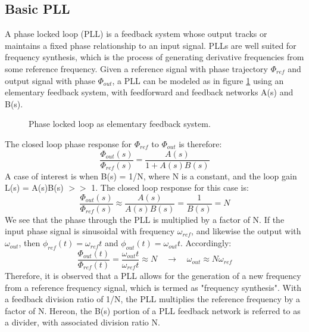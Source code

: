 		



	\subsection{Basic PLL}
	A phase locked loop (PLL) is a feedback system whose output tracks or maintains a fixed phase relationship to an input signal. PLLs are well suited for frequency synthesis, which is the process of generating derivative frequencies from some reference frequency. Given a reference signal with phase trajectory $\Phi_{ref}$ and output signal with phase $\Phi_{out}$, a PLL can be modeled as in figure \ref{fig:basic_fb} using an elementary feedback system, with feedforward and feedback networks A(s) and B(s). 
	\begin{figure}[htb!]
		\center
		\caption{Phase locked loop as elementary feedback system.}
		\label{fig:basic_fb}
	\end{figure}
	\FloatBarrier
	The closed loop phase response for $\Phi_{ref}$ to $\Phi_{out}$ is therefore:
	\begin{equation}
		\frac{\Phi_{out}(s)}{\Phi_{ref}(s)} = \frac{A(s)}{1+A(s)B(s)}
	\end{equation}
	A case of interest is when B(s) = 1/N, where N is a constant, and the loop gain L(s) = A(s)B(s) $>>$ 1. The closed loop response for this case is:
	\begin{equation}\label{mult_by_n}
		\frac{\Phi_{out}(s)}{\Phi_{ref}(s)} \approx \frac{A(s)}{A(s)B(s)} = \frac{1}{B(s)} = N
	\end{equation}
	We see that the phase through the PLL is multiplied by a factor of N. If the input phase signal is sinusoidal with frequency $\omega_{ref}$, and likewise the output with $\omega_{out}$, then $\phi_{ref}(t)=\omega_{ref}t$ and $\phi_{out}(t)=\omega_{out}t$. Accordingly:
	\begin{equation}
		\frac{\Phi_{out}(t)}{\Phi_{ref}(t)} = \frac{\omega_{out}t}{\omega_{ref}t} \approx N \hspace{1em} \rightarrow \hspace{1em} \omega_{out} \approx N\omega_{ref}
	\end{equation}
	Therefore, it is observed that a PLL allows for the generation of a new frequency from a reference frequency signal, which is termed as "frequency synthesis". With a feedback division ratio of 1/N, the PLL multiplies the reference frequency by a factor of N. Hereon, the B(s) portion of a PLL feedback network is referred to as a divider, with associated division ratio N.

